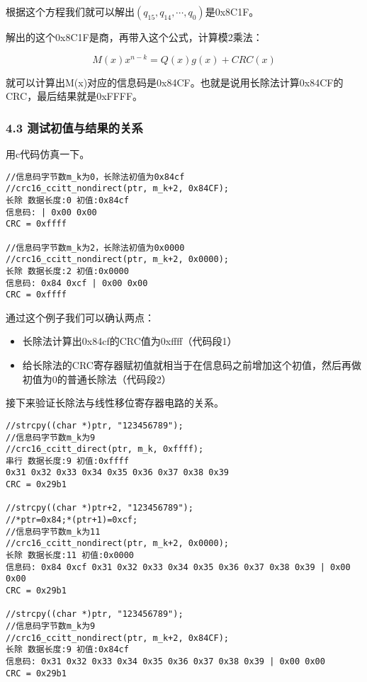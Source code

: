 \documentclass[
]{article}
\begin{document}
根据这个方程我们就可以解出$(q_{15},q_{14},\cdots,q_0)$是0x8C1F。

解出的这个0x8C1F是商，再带入这个公式，计算模2乘法：

\begin{equation}
M(x)x^{n-k}=Q(x)g(x)+CRC(x)
\end{equation}

就可以计算出M(x)对应的信息码是0x84CF。也就是说用长除法计算0x84CF的CRC，最后结果就是0xFFFF。

\hypertarget{header-n220}{%
\subsubsection{4.3 测试初值与结果的关系}\label{header-n220}}

用c代码仿真一下。

\begin{verbatim}
//信息码字节数m_k为0，长除法初值为0x84cf
//crc16_ccitt_nondirect(ptr, m_k+2, 0x84CF);
长除 数据长度:0 初值:0x84cf
信息码: | 0x00 0x00
CRC = 0xffff

//信息码字节数m_k为2，长除法初值为0x0000
//crc16_ccitt_nondirect(ptr, m_k+2, 0x0000);
长除 数据长度:2 初值:0x0000
信息码: 0x84 0xcf | 0x00 0x00
CRC = 0xffff
\end{verbatim}

通过这个例子我们可以确认两点：

\begin{itemize}
\item
  长除法计算出0x84cf的CRC值为0xffff（代码段1）
\item
  给长除法的CRC寄存器赋初值就相当于在信息码之前增加这个初值，然后再做初值为0的普通长除法（代码段2）
\end{itemize}

接下来验证长除法与线性移位寄存器电路的关系。

\begin{verbatim}
//strcpy((char *)ptr, "123456789");
//信息码字节数m_k为9
//crc16_ccitt_direct(ptr, m_k, 0xffff);
串行 数据长度:9 初值:0xffff
0x31 0x32 0x33 0x34 0x35 0x36 0x37 0x38 0x39
CRC = 0x29b1

//strcpy((char *)ptr+2, "123456789");
//*ptr=0x84;*(ptr+1)=0xcf;
//信息码字节数m_k为11
//crc16_ccitt_nondirect(ptr, m_k+2, 0x0000);
长除 数据长度:11 初值:0x0000
信息码: 0x84 0xcf 0x31 0x32 0x33 0x34 0x35 0x36 0x37 0x38 0x39 | 0x00 0x00
CRC = 0x29b1

//strcpy((char *)ptr, "123456789");
//信息码字节数m_k为9
//crc16_ccitt_nondirect(ptr, m_k+2, 0x84CF);
长除 数据长度:9 初值:0x84cf
信息码: 0x31 0x32 0x33 0x34 0x35 0x36 0x37 0x38 0x39 | 0x00 0x00
CRC = 0x29b1
\end{verbatim}
\end{document}
